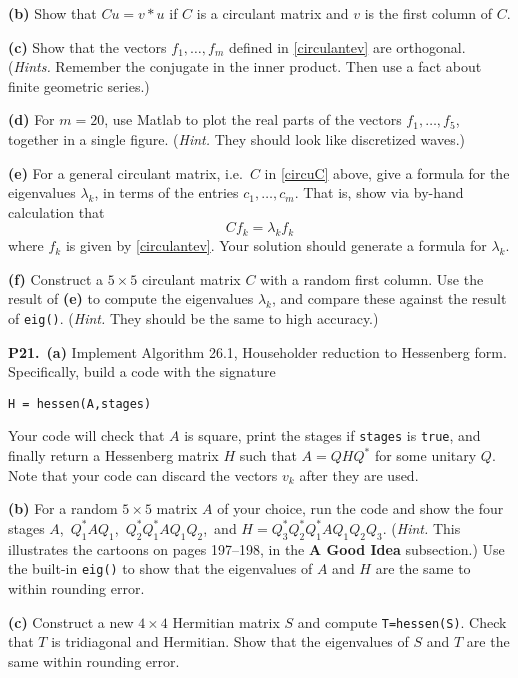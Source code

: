 \documentclass[12pt]{amsart}
\newcommand{\prob}[1]{\bigskip\noindent\textbf{#1.}\quad }
\newcommand{\epart}[1]{\medskip\noindent\textbf{(#1)}\quad }
\newcommand{\ppart}[1]{\,\textbf{(#1)}\quad }
\begin{document}
\epart{b} Show that $C u = v\ast u$ if $C$ is a circulant matrix and $v$ is the first column of $C$.

\epart{c}  Show that the vectors $f_1,\dots,f_m$ defined in \eqref{circulantev} are orthogonal.  (\emph{Hints.}  Remember the conjugate in the inner product.  Then use a fact about finite geometric series.)

\epart{d}  For $m=20$, use Matlab to plot the real parts of the vectors $f_1,\dots,f_5$, together in a single figure.  (\emph{Hint.} They should look like discretized waves.)

\epart{e}  For a general circulant matrix, i.e.~$C$ in \eqref{circuC} above, give a formula for the eigenvalues $\lambda_k$, in terms of the entries $c_1,\dots,c_m$.  That is, show via by-hand calculation that
    $$C f_k = \lambda_k f_k$$
where $f_k$ is given by \eqref{circulantev}.  Your solution should generate a formula for $\lambda_k$.

\epart{f}  Construct a $5\times 5$ circulant matrix $C$ with a random first column.  Use the result of \textbf{(e)} to compute the eigenvalues $\lambda_k$, and compare these against the result of \texttt{eig()}.  (\emph{Hint.}  They should be the same to high accuracy.)


\prob{P21}  \ppart{a}  Implement Algorithm 26.1, Householder reduction to Hessenberg form.  Specifically, build a code with the signature

\begin{center}
\verb|H = hessen(A,stages)|
\end{center}

\noindent Your code will check that $A$ is square, print the stages if \verb|stages| is \verb|true|, and finally return a Hessenberg matrix $H$ such that $A=QHQ^*$ for some unitary $Q$.  Note that your code can discard the vectors $v_k$ after they are used.

\epart{b}  For a random $5\times 5$ matrix $A$ of your choice, run the code and show the four stages $A$,\, $Q_1^*AQ_1$,\, $Q_2^*Q_1^*AQ_1Q_2$,\, and $H=Q_3^*Q_2^*Q_1^*AQ_1Q_2Q_3$.  (\emph{Hint.}  This illustrates the cartoons on pages 197--198, in the \textbf{A Good Idea} subsection.)  Use the built-in \texttt{eig()} to show that the eigenvalues of $A$ and $H$ are the same to within rounding error.

\epart{c}  Construct a new $4\times 4$ Hermitian matrix $S$ and compute \verb|T=hessen(S)|.  Check that $T$ is tridiagonal and Hermitian.  Show that the eigenvalues of $S$ and $T$ are the same within rounding error.
\end{document}
